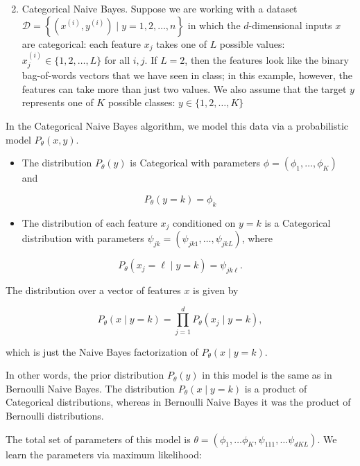 \documentclass[10pt]{article}
\begin{document}
\begin{enumerate}
  \setcounter{enumi}{1}
  \item Categorical Naive Bayes. Suppose we are working with a dataset $\mathscr{D}=\left\{\left(x^{(i)}, y^{(i)}\right) \mid y=1,2, \ldots, n\right\}$ in which the $d$-dimensional inputs $x$ are categorical: each feature $x_{j}$ takes one of $L$ possible values: $x_{j}^{(i)} \in\{1,2, \ldots, L\}$ for all $i, j$. If $L=2$, then the features look like the binary bag-of-words vectors that we have seen in class; in this example, however, the features can take more than just two values. We also assume that the target $y$ represents one of $K$ possible classes: $y \in\{1,2, \ldots, K\}$
\end{enumerate}

In the Categorical Naive Bayes algorithm, we model this data via a probabilistic model $P_{\theta}(x, y)$.

\begin{itemize}
  \item The distribution $P_{\theta}(y)$ is Categorical with parameters $\phi=\left(\phi_{1}, \ldots, \phi_{K}\right)$ and
\end{itemize}

$$
P_{\theta}(y=k)=\phi_{k}
$$

\begin{itemize}
  \item The distribution of each feature $x_{j}$ conditioned on $y=k$ is a Categorical distribution with parameters $\psi_{j k}=\left(\psi_{j k 1}, \ldots, \psi_{j k L}\right)$, where
\end{itemize}

$$
P_{\theta}\left(x_{j}=\ell \mid y=k\right)=\psi_{j k \ell} .
$$

The distribution over a vector of features $x$ is given by

$$
P_{\theta}(x \mid y=k)=\prod_{j=1}^{d} P_{\theta}\left(x_{j} \mid y=k\right),
$$

which is just the Naive Bayes factorization of $P_{\theta}(x \mid y=k)$.

In other words, the prior distribution $P_{\theta}(y)$ in this model is the same as in Bernoulli Naive Bayes. The distribution $P_{\theta}(x \mid y=k)$ is a product of Categorical distributions, whereas in Bernoulli Naive Bayes it was the product of Bernoulli distributions.

The total set of parameters of this model is $\theta=\left(\phi_{1}, \ldots \phi_{K}, \psi_{111}, \ldots \psi_{d K L}\right)$. We learn the parameters via maximum likelihood:
\end{document}
